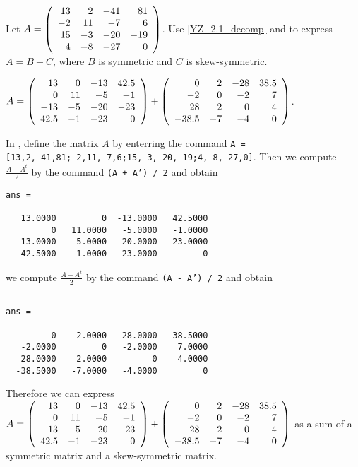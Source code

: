 \documentclass{ximera}
\begin{document}
\begin{computerExercise}\label{YZ_1.3_decomp4}
Let $A = \left(\begin{array}{rrrrrrrrrrrrrrrrrr} 13&2&-41&81\\-2&11&-7&6\\15&-3&-20&-19\\4&-8&-27&0 \end{array}\right)$. Use \eqref{YZ_2.1_decomp} and \Matlab to express $A =  B+C$, where $B$ is symmetric and $C$ is skew-symmetric.

\begin{solution}
\ans $A=\left(\begin{array}{rrrrrrrrrrrrrrrrrr} 13&0&-13&42.5\\0&11&-5&-1\\-13&-5&-20&-23\\42.5&-1&-23&0 \end{array}\right)+\left(\begin{array}{rrrrrrrrrrrrrrrrrr} 0&2&-28&38.5\\-2&0&-2&7\\28&2&0&4\\-38.5&-7&-4&0 \end{array}\right)$.

\soln In \Matlab, define the matrix $A$ by enterring the command {\tt A = [13,2,-41,81;-2,11,-7,6;15,-3,-20,-19;4,-8,-27,0]}. Then we compute $\frac{A+A^t}{2}$ by the command {\tt (A + A') / 2} and obtain 
\begin{verbatim}
ans =

   13.0000         0  -13.0000   42.5000
         0   11.0000   -5.0000   -1.0000
  -13.0000   -5.0000  -20.0000  -23.0000
   42.5000   -1.0000  -23.0000         0

\end{verbatim}
we compute $\frac{A-A^t}{2}$ by the command {\tt (A - A') / 2} and obtain 

\begin{verbatim}

ans =

         0    2.0000  -28.0000   38.5000
   -2.0000         0   -2.0000    7.0000
   28.0000    2.0000         0    4.0000
  -38.5000   -7.0000   -4.0000         0
\end{verbatim}
Therefore we can express $A=\left(\begin{array}{rrrrrrrrrrrrrrrrrr} 13&0&-13&42.5\\0&11&-5&-1\\-13&-5&-20&-23\\42.5&-1&-23&0 \end{array}\right)+\left(\begin{array}{rrrrrrrrrrrrrrrrrr} 0&2&-28&38.5\\-2&0&-2&7\\28&2&0&4\\-38.5&-7&-4&0 \end{array}\right)$ as a sum of a symmetric matrix and a skew-symmetric matrix.
\end{solution}

\end{computerExercise}
\end{document}
